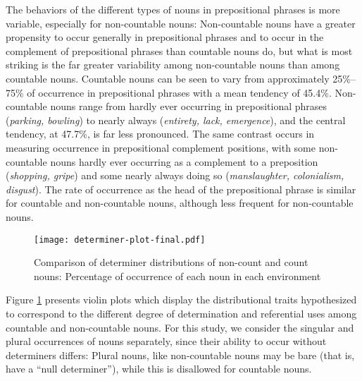 \documentclass[output=paper]{langscibook}
\begin{document}
\begin{sloppypar}
The behaviors of the different types of nouns in prepositional phrases is more variable, especially for non-countable nouns: Non-countable nouns have a greater propensity to occur generally in prepositional phrases and to occur in the complement of  prepositional phrases than countable nouns do, but what is most striking is the far greater variability among non-countable nouns than among countable nouns.  Countable nouns can be seen to vary from approximately 25\%--75\% of occurrence in prepositional phrases with a mean tendency of  45.4\%.  Non-countable nouns range from hardly ever occurring in prepositional phrases (\textit{parking, bowling}) to nearly always (\textit{entirety, lack, emergence}), and the central tendency, at 47.7\%, is far less pronounced. %
The same contrast occurs in measuring occurrence in prepositional complement positions, with some non-countable nouns  hardly ever occurring as a complement to a preposition (\textit{shopping, gripe}) and some nearly always doing so (\textit{manslaughter, colonialism, disgust}). The rate of occurrence as the head of the prepositional phrase is similar for countable and non-countable nouns, although less frequent for non-countable nouns.
\end{sloppypar}



\begin{figure}
    \centering
    \texttt{[image: determiner-plot-final.pdf]}
    \caption{Comparison of determiner distributions of non-count and count nouns: Percentage of occurrence of each noun in  each environment}
    \label{gri-ric:fig:referentialWeight}
\end{figure}




Figure \ref{gri-ric:fig:referentialWeight} presents violin plots which display the distributional traits hypothesized to correspond to the different degree of determination and referential uses among countable and non-countable nouns. For this study,  we consider the singular and plural occurrences of nouns separately, since their ability to occur without determiners differs: Plural nouns, like non-countable nouns may be bare (that is, have a ``null determiner''), while this is disallowed for countable nouns.\largerpage
\end{document}
